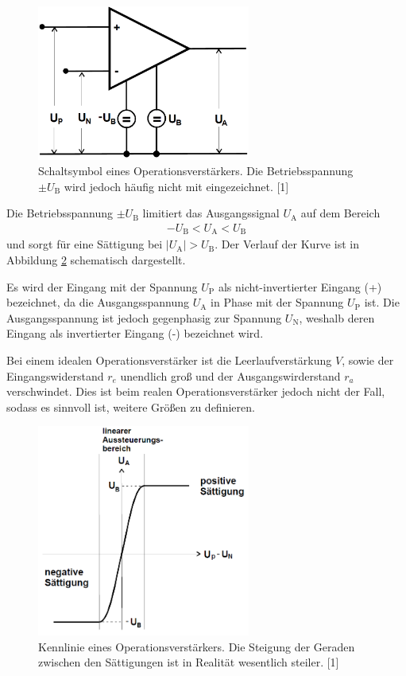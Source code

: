 \documentclass[]{scrartcl}
\begin{document}
\begin{figure}[H]
\centering
\includegraphics[width=7cm]{images/schaltsymbol_operationsverstaerker.png}
\caption{Schaltsymbol eines Operationsverstärkers. Die Betriebsspannung $\pm U_{\text{B}}$ wird jedoch häufig nicht mit eingezeichnet. [1]}
\label{fig:schaltsymbol_operationsverstaerker}
\end{figure}

Die Betriebsspannung $\pm U_{\text{B}}$ limitiert das Ausgangssignal $U_{\text{A}}$ auf dem Bereich
\begin{align}
 -U_{\text{B}} < U_{\text{A}} < U_{\text{B}}
\end{align}
und sorgt für eine Sättigung bei $\left| U_{\text{A}} \right| > U_{\text{B}}$. Der Verlauf der Kurve ist in Abbildung \ref{fig:kennlinie_operationsverstaerker} schematisch dargestellt. 

Es wird der Eingang mit der Spannung $U_{\text{P}}$ als nicht-invertierter Eingang (+) bezeichnet, da die Ausgangs\-spannung $U_{\text{A}}$ in Phase mit der Spannung $U_{\text{P}}$ ist.
Die Ausgangsspannung ist jedoch gegenphasig zur Spannung $U_{\text{N}}$, weshalb deren Eingang als invertierter Eingang (-) bezeichnet wird.

Bei einem idealen Operationsverstärker ist die Leerlaufverstärkung $V$, sowie der Eingangswiderstand $r_{e}$ unendlich groß und der Ausgangswirderstand $r_a$ verschwindet.
Dies ist beim realen Operationsverstärker jedoch nicht der Fall, sodass es sinnvoll ist, weitere Größen zu definieren.

\begin{figure}[H]
\centering
\includegraphics[width=7cm]{images/kennlinie_operationsverstaerker.png}
\caption{Kennlinie eines Operationsverstärkers. Die Steigung der Geraden zwischen den Sättigungen ist in Realität wesentlich steiler. [1]}
\label{fig:kennlinie_operationsverstaerker}
\end{figure}
\end{document}
